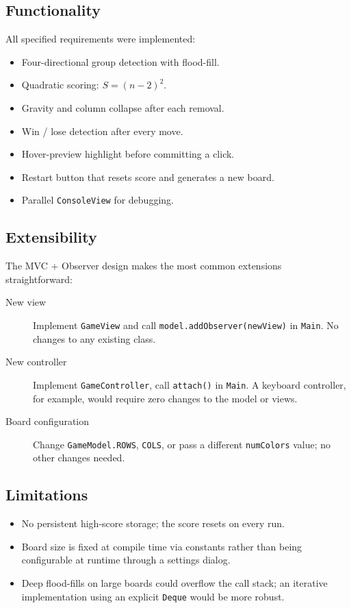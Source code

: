 \documentclass[12pt,a4paper]{article}
\begin{document}
\subsection{Functionality}

All specified requirements were implemented:

\begin{itemize}
  \item Four-directional group detection with flood-fill.
  \item Quadratic scoring: $S = (n-2)^2$.
  \item Gravity and column collapse after each removal.
  \item Win / lose detection after every move.
  \item Hover-preview highlight before committing a click.
  \item Restart button that resets score and generates a new board.
  \item Parallel \texttt{ConsoleView} for debugging.
\end{itemize}

\subsection{Extensibility}

The MVC + Observer design makes the most common extensions straightforward:

\begin{description}
  \item[New view] Implement \texttt{GameView} and call
        \texttt{model.addObserver(newView)} in \texttt{Main}.
        No changes to any existing class.
  \item[New controller] Implement \texttt{GameController}, call
        \texttt{attach()} in \texttt{Main}.
        A keyboard controller, for example, would require zero changes to
        the model or views.
  \item[Board configuration] Change \texttt{GameModel.ROWS}, \texttt{COLS}, or
        pass a different \texttt{numColors} value; no other changes needed.
\end{description}

\subsection{Limitations}

\begin{itemize}
  \item No persistent high-score storage; the score resets on every run.
  \item Board size is fixed at compile time via constants rather than being
        configurable at runtime through a settings dialog.
  \item Deep flood-fills on large boards could overflow the call stack;
        an iterative implementation using an explicit \texttt{Deque} would
        be more robust.
\end{itemize}
\end{document}
